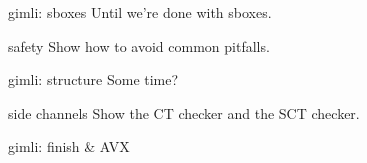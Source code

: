 \documentclass[
  xcolor={table,dvipsnames},
]{beamer}
\begin{document}
\begin{frame}{gimli: sboxes}
  Until we're done with sboxes.
\end{frame}

\begin{frame}{safety}
  Show how to avoid common pitfalls.
\end{frame}

\begin{frame}{gimli: structure}
  Some time?
\end{frame}

\begin{frame}{side channels}
  Show the CT checker and the SCT checker.
\end{frame}

\begin{frame}{gimli: finish \& AVX}
\end{frame}
\end{document}
